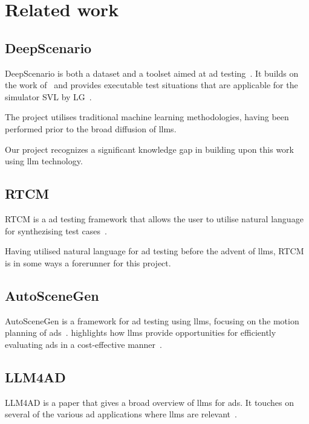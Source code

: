 \section{Related work}\label{sec:relatedWork}


\subsection{DeepScenario}\label{sec:deepScenario}

DeepScenario is both a dataset and a toolset aimed at \acrlong{ad} testing~\cite{DeepScenario}. It
builds on the work of~\cite{CriticalScenarios} and provides executable test situations that are
applicable for the simulator SVL by LG~\cite{lgsvl}.

The project utilises traditional machine learning methodologies, having been performed prior to the
broad diffusion of \acrshort{llms}.

Our project recognizes a significant knowledge gap in building upon this work using \acrshort{llm} technology.

\subsection{RTCM}
RTCM is a \acrshort{ad} testing framework that allows the user to utilise natural language for
synthezising test cases~\cite{RTCM}.

Having utilised natural language for \acrshort{ad} testing before the advent of \acrshort{llms},
RTCM is in some ways a forerunner for this project.

\subsection{AutoSceneGen}

AutoSceneGen is a framework for \acrshort{ad} testing using \acrshort{llms},
focusing on the motion planning of \acrlong{ads}~\cite[14539]{autoSceneGen}.
\citeauthor{autoSceneGen} highlights how \acrshort{llms} provide opportunities
for efficiently evaluating \acrshort{ads} in a cost-effective manner~\cite[14539-14540]{autoSceneGen}.


\subsection{LLM4AD}

LLM4AD is a paper that gives a broad overview of \acrshort{llms} for \acrlong{ads}. It touches on
several of the various \acrshort{ad} applications where \acrshort{llms} are relevant~\cite{LLM4AD}.